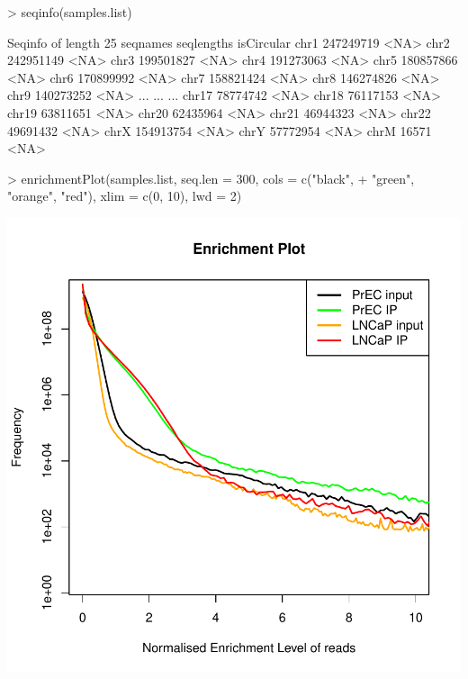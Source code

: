 \begin{Schunk}
\begin{Sinput}
> seqinfo(samples.list)
\end{Sinput}
\begin{Soutput}
Seqinfo of length 25
seqnames seqlengths isCircular
chr1      247249719       <NA>
chr2      242951149       <NA>
chr3      199501827       <NA>
chr4      191273063       <NA>
chr5      180857866       <NA>
chr6      170899992       <NA>
chr7      158821424       <NA>
chr8      146274826       <NA>
chr9      140273252       <NA>
...             ...        ...
chr17      78774742       <NA>
chr18      76117153       <NA>
chr19      63811651       <NA>
chr20      62435964       <NA>
chr21      46944323       <NA>
chr22      49691432       <NA>
chrX      154913754       <NA>
chrY       57772954       <NA>
chrM          16571       <NA>
\end{Soutput}
\begin{Sinput}
> enrichmentPlot(samples.list, seq.len = 300, cols = c("black", 
+     "green", "orange", "red"), xlim = c(0, 10), lwd = 2)
\end{Sinput}
\end{Schunk}
\includegraphics{enrPlot-enrPlot}

